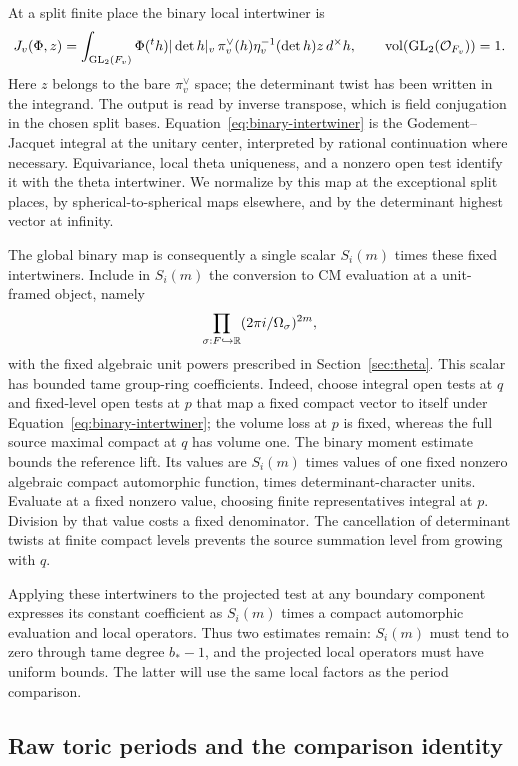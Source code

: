 At a split finite place the binary local intertwiner is
\begin{equation}\label{eq:binary-intertwiner}
 J_v(\Phi,z)=\int_{\operatorname{GL}_2(F_v)}
   \Phi({}^th)|\det h|_v\,
   \pi_v^\vee(h)\eta_v^{-1}(\det h)z\,d^\times h,
 \qquad\operatorname{vol}(\operatorname{GL}_2(\mathcal O_{F_v}))=1.
\end{equation}
Here $z$ belongs to the bare $\pi_v^\vee$ space; the determinant twist
has been written in the integrand.  The output is read by inverse
transpose, which is field conjugation in the chosen split bases.
Equation~\ref{eq:binary-intertwiner} is the Godement--Jacquet integral
at the unitary center, interpreted by rational continuation where
necessary.  Equivariance, local theta uniqueness, and a nonzero open
test identify it with the theta intertwiner.  We normalize by this
map at the exceptional split places, by spherical-to-spherical maps
elsewhere, and by the determinant highest vector at infinity.

The global binary map is consequently a single scalar $S_i(m)$ times
these fixed intertwiners.  Include in $S_i(m)$ the conversion to CM
evaluation at a unit-framed object, namely
\[
 \prod_{\sigma:F\hookrightarrow\mathbb R}
       (2\pi i/\Omega_\sigma)^{2m},
\]
with the fixed algebraic unit powers prescribed in
Section~\ref{sec:theta}.  This scalar has bounded tame group-ring
coefficients.  Indeed, choose integral open tests at $q$ and fixed-level
open tests at $p$ that map a fixed compact vector to itself under
Equation~\ref{eq:binary-intertwiner}; the volume loss at $p$ is fixed,
whereas the full source maximal compact at $q$ has volume one.  The
binary moment estimate bounds the reference lift.  Its values are
$S_i(m)$ times values of one fixed nonzero algebraic compact automorphic
function, times determinant-character units.  Evaluate at a fixed
nonzero value, choosing finite representatives integral at $p$.
Division by that value costs a fixed denominator.  The cancellation
of determinant twists at finite compact levels prevents the source
summation level from growing with $q$.

Applying these intertwiners to the projected test at any boundary
component expresses its constant coefficient as $S_i(m)$ times a
compact automorphic evaluation and local operators.  Thus two estimates
remain: $S_i(m)$ must tend to zero through tame degree $b_*-1$, and the
projected local operators must have uniform bounds.  The latter will
use the same local factors as the period comparison.

\subsection{Raw toric periods and the comparison identity}

